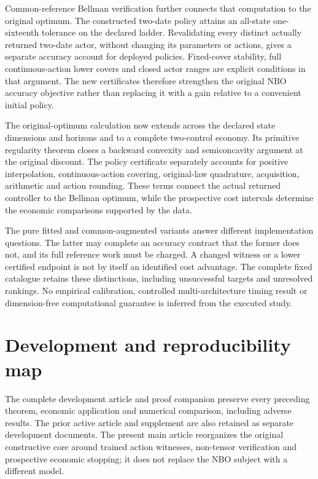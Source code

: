 \documentclass[ecta,nameyear,draft]{econsocart}
\begin{document}
Common-reference Bellman verification further connects that computation to the original optimum. The constructed two-date policy attains an all-state one-sixteenth tolerance on the declared ladder. Revalidating every distinct actually returned two-date actor, without changing its parameters or actions, gives a separate accuracy account for deployed policies. Fixed-cover stability, full continuous-action lower covers and closed actor ranges are explicit conditions in that argument. The new certificates therefore strengthen the original NBO accuracy objective rather than replacing it with a gain relative to a convenient initial policy.

The original-optimum calculation now extends across the declared state dimensions and horizons and to a complete two-control economy. Its primitive regularity theorem closes a backward convexity and semiconcavity argument at the original discount. The policy certificate separately accounts for positive interpolation, continuous-action covering, original-law quadrature, acquisition, arithmetic and action rounding. These terms connect the actual returned controller to the Bellman optimum, while the prospective cost intervals determine the economic comparisons supported by the data.

The pure fitted and common-augmented variants answer different implementation questions. The latter may complete an accuracy contract that the former does not, and its full reference work must be charged. A changed witness or a lower certified endpoint is not by itself an identified cost advantage. The complete fixed catalogue retains these distinctions, including unsuccessful targets and unresolved rankings. No empirical calibration, controlled multi-architecture timing result or dimension-free computational guarantee is inferred from the executed study.

\appendix
\section{Development and reproducibility map}\label{sec:map56}
The complete development article and proof companion preserve every preceding theorem, economic application and numerical comparison, including adverse results. The prior active article and supplement are also retained as separate development documents. The present main article reorganizes the original constructive core around trained action witnesses, non-tensor verification and prospective economic stopping; it does not replace the NBO subject with a different model.
\end{document}
